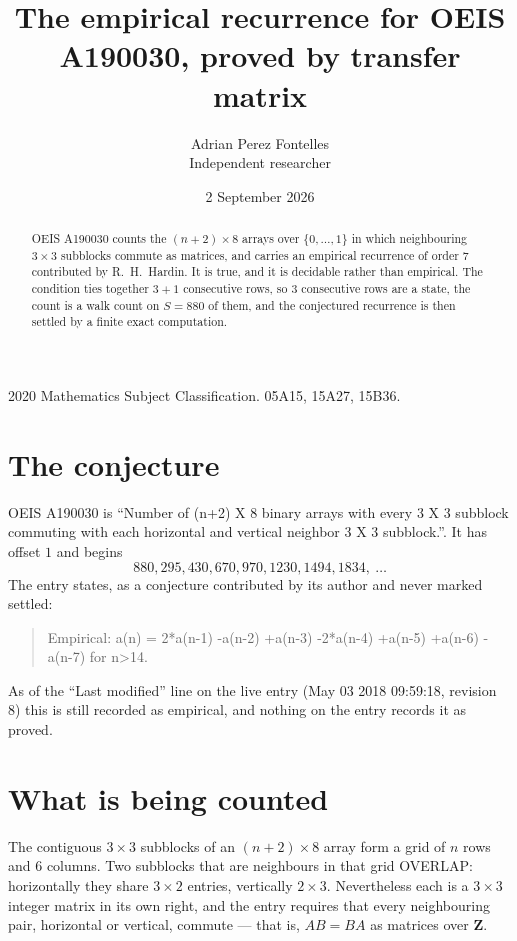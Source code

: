 \documentclass[11pt,a4paper]{article}
\title{The empirical recurrence for OEIS A190030, proved by transfer matrix}
\author{Adrian Perez Fontelles\\ \small Independent researcher}
\date{2 September 2026}
\theoremstyle{plain}
\theoremstyle{definition}
\begin{document}
\maketitle

\begin{abstract}
OEIS A190030 counts the $(n+2)\times8$ arrays over $\{0,\dots,1\}$ in which
neighbouring $3\times3$ subblocks commute as matrices, and carries an empirical
recurrence
of order $7$ contributed by R.~H.~Hardin. It is true, and it is decidable rather than
empirical. The condition ties together $3+1$ consecutive rows, so $3$ consecutive rows are
a state, the count is a walk count on $S=880$ of them, and the conjectured recurrence is then
settled by a finite exact computation.
\end{abstract}

\noindent\small 2020 Mathematics Subject Classification. 05A15, 15A27, 15B36.\normalsize

\section{The conjecture}

OEIS A190030 is ``Number of (n+2) X 8 binary arrays with every 3 X 3 subblock commuting with each horizontal and vertical neighbor 3 X 3 subblock.''. It has offset $1$ and begins
\[
880, 295, 430, 670, 970, 1230, 1494, 1834,\ \dots
\]
The entry states, as a conjecture contributed by its author and never marked settled:
\begin{quote}
Empirical: a(n) = 2*a(n-1) -a(n-2) +a(n-3) -2*a(n-4) +a(n-5) +a(n-6) -a(n-7) for n>14.
\end{quote}
As of the ``Last modified'' line on the live entry (May 03 2018 09:59:18, revision 8) this is still
recorded as empirical, and nothing on the entry records it as proved.

\section{What is being counted}

The contiguous $3\times3$ subblocks of an $(n+2)\times8$ array form a grid of $n$
rows and $6$ columns. Two subblocks that are neighbours in that
grid OVERLAP: horizontally they share $3\times2$ entries, vertically
$2\times3$. Nevertheless each is a $3\times3$ integer matrix in its own right, and
the entry requires that every neighbouring pair, horizontal or vertical, commute --- that is,
$AB=BA$ as matrices over $\mathbf{Z}$.
\end{document}
